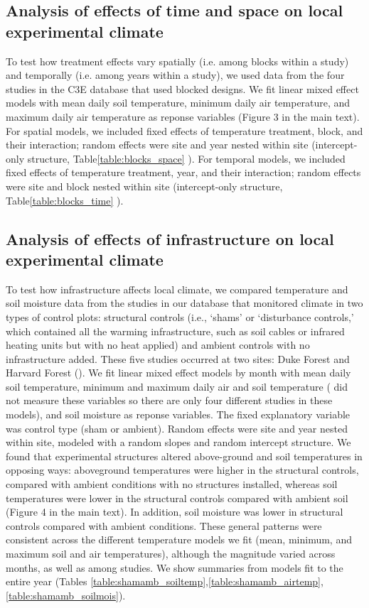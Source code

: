 \documentclass{article}
\begin{document}
\subsection* {Analysis of effects of time and space on local experimental climate}
To test how treatment effects vary spatially (i.e. among blocks within a study) and temporally (i.e. among years within a study), we used data from the four studies in the C3E database that used blocked designs. We fit linear mixed effect models with mean daily soil temperature, minimum daily air temperature, and maximum daily air temperature as reponse variables (Figure 3 in the main text). For spatial models, we included fixed effects of temperature treatment, block, and their interaction; random effects were site and year nested within site (intercept-only structure, Table\ref{table:blocks_space}
).  For temporal models, we included fixed effects of temperature treatment, year, and their interaction; random effects were site and block nested within site (intercept-only structure, Table\ref{table:blocks_time}
). 
\subsection* {Analysis of effects of infrastructure on local experimental climate}
To test how infrastructure affects local climate, we compared temperature and soil moisture data from the studies in our database that
monitored climate in two types of control plots: structural controls (i.e., `shams' or `disturbance controls,'
which contained all the warming infrastructure, such as soil cables or infrared heating units but with no heat
applied) and ambient controls with no infrastructure added. These five studies occurred at two sites: Duke Forest and Harvard Forest (\citep{farnsworth1995,clark20141,marchin2015,pelini2011}). We fit linear mixed effect models by month with mean daily soil temperature, minimum and maximum daily air and soil temperature (\citep{farnsworth1995} did not measure these variables so there are only four different studies in these models), and soil moisture as reponse variables. The fixed explanatory variable was control type (sham or ambient). Random effects were site and year nested within site, modeled with a random slopes and random intercept structure. 
We found that experimental structures altered above-ground and soil temperatures in opposing ways: aboveground
temperatures were higher in the structural controls, compared with ambient conditions with no
structures installed, whereas soil temperatures were lower in the structural controls compared with ambient
soil (Figure 4 in the main text).  In addition, soil moisture was lower in
structural controls compared with ambient conditions. These general patterns were consistent across the different temperature models we fit (mean,
minimum, and maximum soil and air temperatures), although the magnitude varied across months, as well
as among studies. We show summaries from models fit to the entire year (Tables \ref{table:shamamb_soiltemp},\ref{table:shamamb_airtemp}, \ref{table:shamamb_soilmois}).
\end{document}
